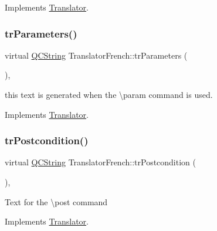 Implements \mbox{\hyperlink{class_translator}{Translator}}.

\mbox{\label{class_translator_french_a1d9e43cd67f58f339bac47aef4501d01}} 
\subsubsection{\texorpdfstring{trParameters()}{trParameters()}}
{\footnotesize\ttfamily virtual \mbox{\hyperlink{class_q_c_string}{Q\+C\+String}} Translator\+French\+::tr\+Parameters (\begin{DoxyParamCaption}{ }\end{DoxyParamCaption})\hspace{0.3cm}{\ttfamily [inline]}, {\ttfamily [virtual]}}

this text is generated when the \textbackslash{}param command is used. 

Implements \mbox{\hyperlink{class_translator}{Translator}}.

\mbox{\label{class_translator_french_a669d70e8bbbcf0c541d69055f0084a41}} 
\subsubsection{\texorpdfstring{trPostcondition()}{trPostcondition()}}
{\footnotesize\ttfamily virtual \mbox{\hyperlink{class_q_c_string}{Q\+C\+String}} Translator\+French\+::tr\+Postcondition (\begin{DoxyParamCaption}{ }\end{DoxyParamCaption})\hspace{0.3cm}{\ttfamily [inline]}, {\ttfamily [virtual]}}

Text for the \textbackslash{}post command 

Implements \mbox{\hyperlink{class_translator}{Translator}}.

\mbox{\label{class_translator_french_a7b54fe7835237f423d751ac7c3806f90}} 
